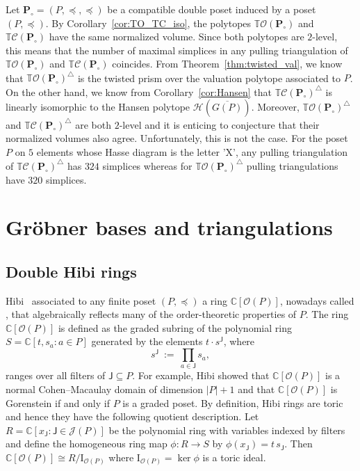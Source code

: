 \documentclass[11pt]{amsart}
\theoremstyle{definition}
\begin{document}
Let ${\mathbf{P}}_\circ = ({P},\preceq,\preceq)$ be a compatible double poset induced by
a poset $({P},\preceq)$.  By Corollary~\ref{cor:TO_TC_iso}, the polytopes
${{\mathbb{T}}{\mathcal{O}({{{\mathbf{P}}_\circ}})}}$ and ${{\mathbb{T}}{\mathcal{C}({{{{\mathbf{P}}_\circ}}})}}$ have the same normalized volume.
Since both polytopes are $2$-level, this means that the number of maximal
simplices in any pulling triangulation of ${{\mathbb{T}}{\mathcal{O}({{{\mathbf{P}}_\circ}})}}$ and
${{\mathbb{T}}{\mathcal{C}({{{{\mathbf{P}}_\circ}}})}}$ coincides.  From Theorem~\ref{thm:twisted_val}, we know
that ${{\mathbb{T}}{\mathcal{O}({{{\mathbf{P}}_\circ}})}}^{\triangle}$ is the twisted prism over the valuation polytope
associated to ${P}$. On the other hand, we know from Corollary~\ref{cor:Hansen}
that ${{\mathbb{T}}{\mathcal{C}({{{{\mathbf{P}}_\circ}}})}}^{\triangle}$ is linearly isomorphic to the Hansen polytope
${\mathcal{H}({\overline{G({P})}})}$. Moreover, ${{\mathbb{T}}{\mathcal{O}({{{\mathbf{P}}_\circ}})}}^{\triangle}$ and
${{\mathbb{T}}{\mathcal{C}({{{{\mathbf{P}}_\circ}}})}}^{\triangle}$ are both $2$-level and it is enticing to conjecture
that their normalized volumes also agree. Unfortunately, this is not the case.
For the poset ${P}$ on $5$ elements whose Hasse diagram is the letter 'X', any
pulling triangulation of ${{\mathbb{T}}{\mathcal{C}({{{{\mathbf{P}}_\circ}}})}}^{\triangle}$ has $324$ simplices whereas
for ${{\mathbb{T}}{\mathcal{O}({{{\mathbf{P}}_\circ}})}}^{\triangle}$ pulling triangulations have $320$ simplices.

\section{Gr\"obner bases and triangulations}\label{sec:GB}

\subsection{Double Hibi rings}\label{ssec:double_hibi}
Hibi~\cite{Hibi87} associated to any finite poset $({P},\preceq)$ a ring
${{\mathbb{C}}[{\mathcal{O}({P})}]}$, nowadays called {\textbf{\color{black}{Hibi ring}}}, that algebraically reflects
many of the order-theoretic properties of ${P}$. The ring ${{\mathbb{C}}[{\mathcal{O}({P})}]}$ is
defined as the graded subring of the polynomial ring $S = {\mathbb{C}}[t, s_a : a \in {P}]$
generated by the elements $t \cdot s^{\mathsf{J}}$, where
\[
    s^{\mathsf{J}} \ := \  \prod_{a \in {\mathsf{J}}} s_a,
\]
ranges over all filters of ${\mathsf{J}} \subseteq {P}$. For example, Hibi showed
that ${{\mathbb{C}}[{\mathcal{O}({P})}]}$ is a normal Cohen--Macaulay domain of dimension $|{P}|+1$ and
that ${{\mathbb{C}}[{\mathcal{O}({P})}]}$ is Gorenstein if and only if ${P}$ is a graded poset. By definition, Hibi rings are toric and hence they have the following quotient description. Let $R =
{\mathbb{C}}[x_{\mathsf{J}} : {\mathsf{J}} \in {{\mathcal{J}}({P})}]$ be the polynomial ring with variables
indexed by filters and define the homogeneous ring map $\phi : R \rightarrow
S$ by $\phi(x_{\mathsf{J}}) = t\, s_{\mathsf{J}}$. Then ${{\mathbb{C}}[{\mathcal{O}({P})}]} \cong R /
{\mathrm{I}}_{{\mathcal{O}({P})}}$
where ${\mathrm{I}}_{{\mathcal{O}({P})}} = \ker \phi$ is a toric ideal. 
\end{document}

